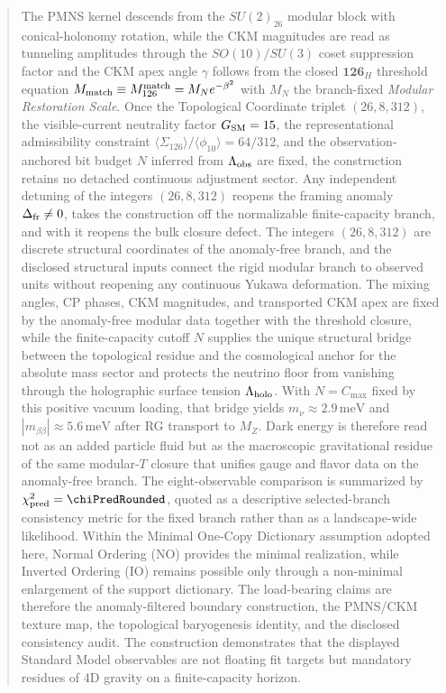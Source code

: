 \documentclass[11pt]{article}
\begin{document}
\begin{abstract}
The PMNS kernel descends from the $SU(2)_{26}$ modular block with
conical-holonomy rotation, while the CKM magnitudes are read as tunneling
amplitudes through the $SO(10)/SU(3)$ coset suppression factor and the CKM apex
angle $\gamma$ follows from the closed $\mathbf{126}_H$ threshold equation
$M_{\rm match}\equiv M_{126}^{\rm match}=M_Ne^{-\beta^2}$ with $M_N$ the
branch-fixed \emph{Modular Restoration Scale}. Once the Topological Coordinate
triplet $(26,8,312)$, the visible-current neutrality factor $G_{\rm SM}=15$,
the representational admissibility constraint
$\langle \Sigma_{126}\rangle/\langle\phi_{10}\rangle=64/312$, and the
observation-anchored bit budget $N$ inferred from $\Lambda_{\rm obs}$ are
fixed, the construction retains no detached continuous adjustment sector. Any
independent detuning of the integers $(26,8,312)$ reopens the framing anomaly
$\Delta_{\rm fr}\neq0$, takes the construction off the normalizable
finite-capacity branch, and with it reopens the bulk closure defect. The
integers $(26,8,312)$ are discrete structural coordinates of the anomaly-free
branch, and the disclosed structural inputs connect the rigid modular branch to
observed units without reopening any continuous Yukawa deformation. The mixing
angles, CP phases, CKM magnitudes, and transported CKM apex are fixed by the
anomaly-free modular data together with the threshold closure, while the
finite-capacity cutoff $N$ supplies the unique structural bridge between the
topological residue and the cosmological anchor for the absolute mass sector
and protects the neutrino floor from vanishing through the holographic surface
tension $\Lambda_{\rm holo}$. With $N=C_{\max}$ fixed by this positive vacuum
loading, that bridge yields $m_\nu\approx2.9\,\mathrm{meV}$ and
$|m_{\beta\beta}|\approx5.6\,\mathrm{meV}$ after RG transport to $M_Z$.
Dark energy is therefore read not as an added particle fluid but as the
macroscopic gravitational residue of the same modular-$T$ closure that unifies
gauge and flavor data on the anomaly-free branch. The eight-observable
comparison is summarized by $\chi_{\rm pred}^2=\chiPredRounded$, quoted as a
descriptive selected-branch consistency metric for the fixed branch rather than
as a landscape-wide likelihood. Within the Minimal One-Copy Dictionary
assumption adopted here, Normal Ordering (NO) provides the minimal
realization, while Inverted Ordering (IO) remains possible only through a
non-minimal enlargement of the support dictionary. The load-bearing claims are
therefore the anomaly-filtered boundary construction, the PMNS/CKM texture map,
the topological baryogenesis identity, and the disclosed consistency audit. The
construction demonstrates that the displayed Standard Model observables are not
floating fit targets but mandatory residues of 4D gravity on a finite-capacity
horizon.
\end{abstract}
\end{document}
